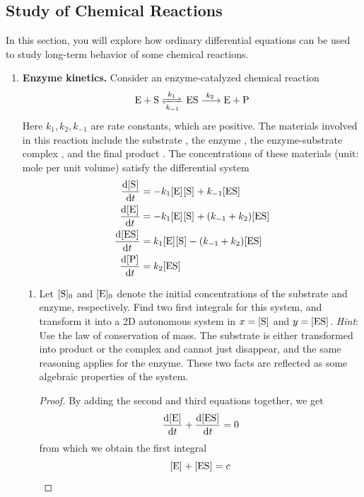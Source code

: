 \documentclass[../psets.tex]{subfiles}
\begin{document}
\subsection*{Study of Chemical Reactions}
In this section, you will explore how ordinary differential equations can be used to study long-term behavior of some chemical reactions.
\begin{enumerate}
    \item \textbf{Enzyme kinetics.} Consider an enzyme-catalyzed chemical reaction
    \begin{equation*}
        \ce{E + S <=>[$k_1$][$k_{-1}$] ES ->[$k_2$] E + P}
    \end{equation*}
    Here $k_1,k_2,k_{-1}$ are rate constants, which are positive. The materials involved in this reaction include the substrate , the enzyme , the enzyme-substrate complex , and the final product . The concentrations of these materials (unit: mole per unit volume) satisfy the differential system
    \begin{align*}
        \dv{\cnc{S}}{t} &= -k_1\cnc{E}\cnc{S}+k_{-1}\cnc{ES}\\
        \dv{\cnc{E}}{t} &= -k_1\cnc{E}\cnc{S}+(k_{-1}+k_2)\cnc{ES}\\
        \dv{\cnc{ES}}{t} &= k_1\cnc{E}\cnc{S}-(k_{-1}+k_2)\cnc{ES}\\
        \dv{\cnc{P}}{t} &= k_2\cnc{ES}
    \end{align*}
    \begin{enumerate}
        \item Let $\cnc[0]{S}$ and $\cnc[0]{E}$ denote the initial concentrations of the substrate and enzyme, respectively. Find two first integrals for this system, and transform it into a 2D autonomous system in $x=\cnc{S}$ and $y=\cnc{ES}$. \emph{Hint}: Use the law of conservation of mass. The substrate is either transformed into product or the  complex and cannot just disappear, and the same reasoning applies for the enzyme. These two facts are reflected as some algebraic properties of the system.
        \begin{proof}
            By adding the second and third equations together, we get
            \begin{equation*}
                \dv{\cnc{E}}{t}+\dv{\cnc{ES}}{t} = 0
            \end{equation*}
            from which we obtain the first integral
            \begin{equation*}
                \cnc{E}+\cnc{ES} = c
            \end{equation*}

\end{proof}
\end{enumerate}
\end{enumerate}
\end{document}
